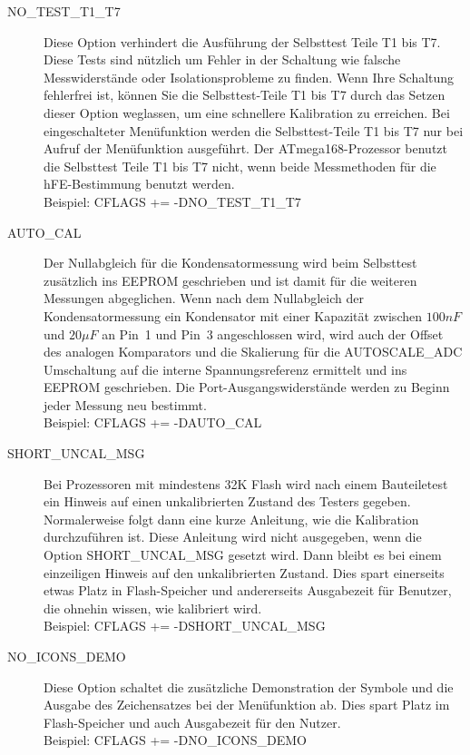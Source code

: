 \begin{description}
  \item[NO\_TEST\_T1\_T7] Diese Option verhindert die Ausführung der Selbsttest Teile T1 bis T7.
Diese Tests sind nützlich um Fehler in der Schaltung wie falsche Messwiderstände oder Isolationsprobleme zu finden.
Wenn Ihre Schaltung fehlerfrei ist, können Sie die Selbsttest-Teile T1 bis T7 durch das Setzen dieser Option weglassen, um eine
schnellere Kalibration zu erreichen.
Bei eingeschalteter Menüfunktion werden die Selbsttest-Teile T1 bis T7 nur bei Aufruf der Menüfunktion  ausgeführt.
Der ATmega168-Prozessor benutzt die Selbsttest Teile T1 bis T7 nicht, wenn beide Messmethoden für die hFE-Bestimmung benutzt werden.\\
Beispiel: CFLAGS += -DNO\_TEST\_T1\_T7

  \item[AUTO\_CAL] Der Nullabgleich für die Kondensatormessung wird beim
Selbsttest zusätzlich ins EEPROM geschrieben und ist damit für die weiteren Messungen abgeglichen.
Wenn nach dem Nullabgleich der Kondensatormessung ein Kondensator mit einer Kapazität zwischen \(100nF\) und \(20\mu F\) an Pin~1 und Pin~3 
angeschlossen wird, wird auch der Offset des analogen Komparators und die Skalierung für die AUTOSCALE\_ADC
Umschaltung auf die interne Spannungsreferenz ermittelt und ins EEPROM geschrieben.
Die Port-Ausgangswiderstände werden zu Beginn jeder Messung neu bestimmt. \\
Beispiel: CFLAGS += -DAUTO\_CAL

  \item[SHORT\_UNCAL\_MSG] Bei Prozessoren mit mindestens 32K Flash  wird nach einem Bauteiletest ein Hinweis auf einen unkalibrierten Zustand
des Testers gegeben. Normalerweise folgt dann eine kurze Anleitung, wie die Kalibration durchzuführen ist.
Diese Anleitung wird nicht ausgegeben, wenn die Option SHORT\_UNCAL\_MSG gesetzt wird.
Dann bleibt es bei einem einzeiligen Hinweis auf den unkalibrierten Zustand. 
Dies spart einerseits etwas Platz in Flash-Speicher und andererseits Ausgabezeit für Benutzer,
die ohnehin wissen, wie kalibriert wird.\\
Beispiel: CFLAGS += -DSHORT\_UNCAL\_MSG

 \item[NO\_ICONS\_DEMO]
Diese Option schaltet die zusätzliche Demonstration der Symbole und die Ausgabe des Zeichensatzes bei der Menüfunktion
 ab.
Dies spart Platz im Flash-Speicher und auch Ausgabezeit für den Nutzer.\\
Beispiel: CFLAGS += -DNO\_ICONS\_DEMO


\end{description}
